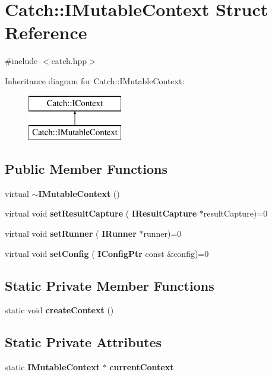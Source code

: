 \section{Catch\+::I\+Mutable\+Context Struct Reference}
\label{struct_catch_1_1_i_mutable_context}


{\ttfamily \#include $<$catch.\+hpp$>$}

Inheritance diagram for Catch\+::I\+Mutable\+Context\+:\begin{figure}[H]
\begin{center}
\leavevmode
\includegraphics[height=2.000000cm]{struct_catch_1_1_i_mutable_context}
\end{center}
\end{figure}
\subsection*{Public Member Functions}
\begin{DoxyCompactItemize}
\item 
virtual \textbf{ $\sim$\+I\+Mutable\+Context} ()
\item 
virtual void \textbf{ set\+Result\+Capture} (\textbf{ I\+Result\+Capture} $\ast$result\+Capture)=0
\item 
virtual void \textbf{ set\+Runner} (\textbf{ I\+Runner} $\ast$runner)=0
\item 
virtual void \textbf{ set\+Config} (\textbf{ I\+Config\+Ptr} const \&config)=0
\end{DoxyCompactItemize}
\subsection*{Static Private Member Functions}
\begin{DoxyCompactItemize}
\item 
static void \textbf{ create\+Context} ()
\end{DoxyCompactItemize}
\subsection*{Static Private Attributes}
\begin{DoxyCompactItemize}
\item 
static \textbf{ I\+Mutable\+Context} $\ast$ \textbf{ current\+Context}
\end{DoxyCompactItemize}
